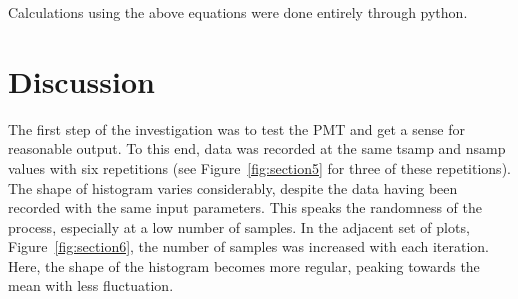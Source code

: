 \documentclass[a4paper,12pt]{article}
\begin{document}
Calculations using the above equations were done entirely through python.

\section{Discussion}

The first step of the investigation was to test the PMT and get a sense for reasonable output. To this end, data was recorded at the same tsamp and nsamp values with six repetitions (see Figure~\ref{fig:section5} for three of these repetitions). The shape of histogram varies considerably, despite the data having been recorded with the same input parameters. This speaks the randomness of the process, especially at a low number of samples. In the adjacent set of plots, Figure~\ref{fig:section6}, the number of samples was increased with each iteration. Here, the shape of the histogram becomes more regular, peaking towards the mean with less fluctuation.
\end{document}
